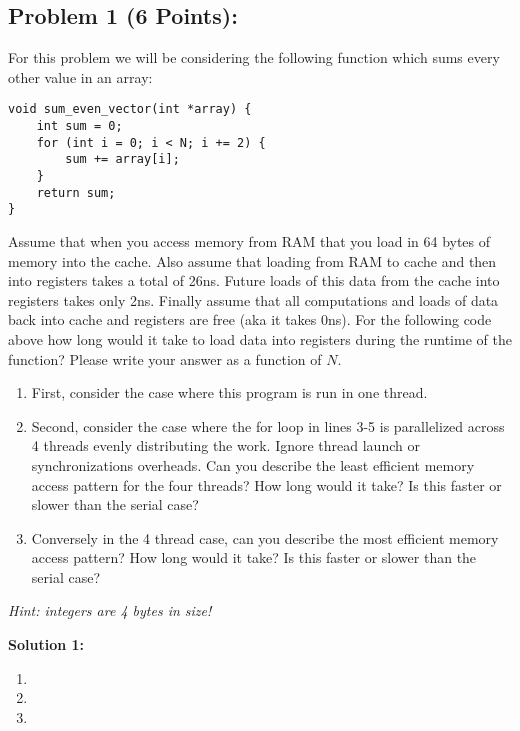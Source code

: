 \documentclass[]{article}
\begin{document}
\subsection*{Problem 1 (6 Points):}
For this problem we will be considering the following function which sums every other value in an array:
\begin{lstlisting}
void sum_even_vector(int *array) {
    int sum = 0;
    for (int i = 0; i < N; i += 2) {
        sum += array[i];
    }
    return sum;
}
\end{lstlisting}
Assume that when you access memory from RAM that you load in 64 bytes of memory into the cache. Also assume that loading from RAM to cache and then into registers takes a total of 26ns. Future loads of this data from the cache into registers takes only 2ns. Finally assume that all computations and loads of data back into cache and registers are free (aka it takes 0ns). For the following code above how long would it take to load data into registers during the runtime of the function? Please write your answer as a function of $N$.
\begin{enumerate}[label=(\alph*)]
    \item First, consider the case where this program is run in one thread.
    \item Second, consider the case where the for loop in lines 3-5 is parallelized across 4 threads evenly distributing the work. Ignore thread launch or synchronizations overheads. Can you describe the least efficient memory access pattern for the four threads? How long would it take? Is this faster or slower than the serial case?
    \item Conversely in the 4 thread case, can you describe the most efficient memory access pattern? How long would it take? Is this faster or slower than the serial case?
\end{enumerate}
\textit{Hint: integers are 4 bytes in size!}

\bigskip
\textbf{Solution 1:}
\begin{enumerate}[label=(\alph*)]
    \item %
    \item %
    \item %
\end{enumerate}

\clearpage
\end{document}
